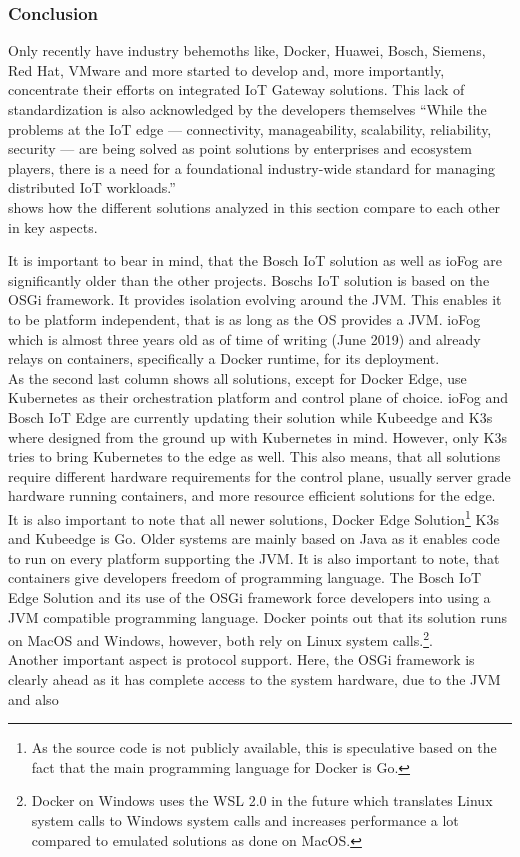 \subsubsection{Conclusion}
Only recently have industry behemoths like, Docker, Huawei, Bosch, Siemens, Red Hat, VMware and more\cite{K8sattheEdgeContectOnWorkingGroup:online} started to develop and, more importantly, concentrate their efforts on integrated IoT Gateway solutions. This lack of standardization is also acknowledged by the developers themselves ``While the problems at the IoT edge — connectivity, manageability, scalability, reliability, security — are being solved as point solutions by enterprises and ecosystem players, there is a need for a foundational industry-wide standard for managing distributed IoT workloads.''\cite{ioFogK8sBlog:online}\\
 shows how the different solutions analyzed in this section compare to each other in key aspects.

It is important to bear in mind, that the Bosch IoT solution as well as ioFog are significantly older than the other projects. Boschs IoT solution is based on the OSGi framework. It provides isolation evolving around the JVM. This enables it to be platform independent, that is as long as the OS provides a JVM. ioFog which is almost three years old as of time of writing (June 2019) and already relays on containers, specifically a Docker runtime, for its deployment.\\
As the second last column shows all solutions, except for Docker Edge, use Kubernetes as their orchestration platform and control plane of choice. ioFog and Bosch IoT Edge are currently updating their solution while Kubeedge and K3s where designed from the ground up with Kubernetes in mind. However, only K3s tries to bring Kubernetes to the edge as well. This also means, that all solutions require different hardware requirements for the control plane, usually server grade hardware running containers, and more resource efficient solutions for the edge. \\
It is also important to note that all newer solutions, Docker Edge Solution\footnote{As the source code is not publicly available, this is speculative based on the fact that the main programming language for Docker is Go.} K3s and Kubeedge is Go. Older systems are mainly based on Java as it enables code to run on every platform supporting the JVM. It is also important to note, that containers give developers freedom of programming language. The Bosch IoT Edge Solution and its use of the OSGi framework force developers into using a JVM compatible programming language. Docker points out that its solution runs on MacOS and Windows, however, both rely on Linux system calls.\footnote{Docker on Windows uses the WSL 2.0 in the future which translates Linux system calls to Windows system calls and increases performance a lot compared to emulated solutions as done on MacOS.}.\\
Another important aspect is protocol support. Here, the OSGi framework is clearly ahead as it has complete access to the system hardware, due to the JVM and also 




